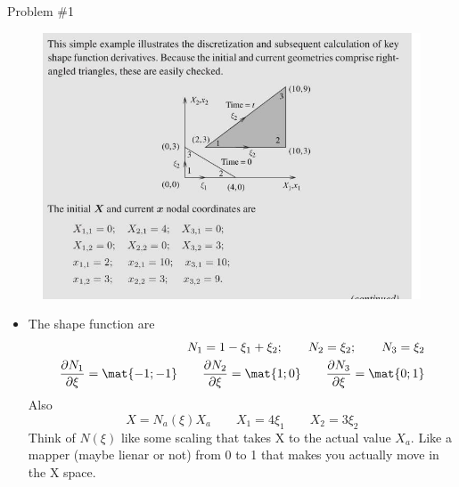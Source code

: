 	\begin{frame}{Problem \#1}
		\begin{figure}
			\centering
			\includegraphics[width=0.5\linewidth]{Figure/fig12}
		\end{figure}
		\begin{itemize}
			\item The shape function are 
			\begin{equation}
				\begin{aligned}
				N_1 = 1 - \xi_1 + \xi_2;\qquad N_2 = \xi_2;\qquad N_3 = \xi_2 \\
				\frac{\partial N_1}{\partial \xi} = \mat{-1;-1} \qquad \frac{\partial N_2}{\partial \xi} = \mat{1;0} \qquad \frac{\partial N_3}{\partial \xi} = \mat{0;1} 
				\end{aligned}
			\end{equation}
			Also
			\begin{equation}
			X = N_a(\xi) X_a \qquad X_1 = 4\xi_1 \qquad X_2 = 3\xi_2
			\end{equation}
			Think of $N(\xi)$ like some scaling that takes X to the actual value $X_a$. Like a mapper (maybe lienar or not) from 0 to 1 that makes you actually move in the X space.
		\end{itemize}
	\end{frame}


